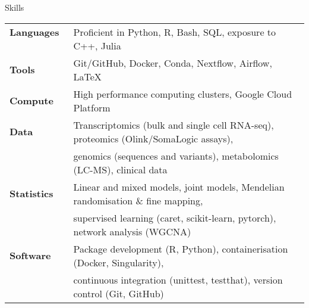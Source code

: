 \documentclass{resume}
\begin{document}
\begin{rSection}{Skills}

\begin{tabular}{ @{} >{\bfseries}l @{\hspace{3ex}} l }
Languages \ & Proficient in Python, R, Bash, SQL, exposure to C++, Julia \vspace{2pt plus 1pt minus 1pt} \\
Tools \ & Git/GitHub, Docker, Conda, Nextflow, Airflow, \LaTeX \vspace{2pt plus 1pt minus 1pt} \\
Compute \ & High performance computing clusters, Google Cloud Platform \vspace{2pt plus 1pt minus 1pt} \\
Data \ & Transcriptomics (bulk and single cell RNA-seq), proteomics (Olink/SomaLogic assays), \\
     \ & genomics (sequences and variants), metabolomics (LC-MS), clinical data \vspace{2pt plus 1pt minus 1pt} \\
Statistics \ & Linear and mixed models, joint models, Mendelian randomisation \& fine mapping, \\
           \ & supervised learning (caret, scikit-learn, pytorch), network analysis (WGCNA) \vspace{2pt plus 1pt minus 1pt} \\
Software \ & Package development (R, Python), containerisation (Docker, Singularity),   \\
         \ & continuous integration (unittest, testthat), version control (Git, GitHub) \\
\end{tabular}



\end{rSection}
\end{document}
